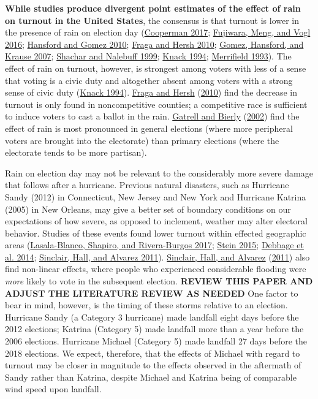 \documentclass[
  12pt,
]{article}
\begin{document}
\textbf{While studies produce divergent point estimates of the effect of rain on turnout in the United States}, the consensus is that turnout is lower in the presence of rain on election day (\protect\hyperlink{ref-Cooperman2017}{Cooperman 2017}; \protect\hyperlink{ref-Fujiwara2016}{Fujiwara, Meng, and Vogl 2016}; \protect\hyperlink{ref-Hansford2010}{Hansford and Gomez 2010}; \protect\hyperlink{ref-Fraga2010}{Fraga and Hersh 2010}; \protect\hyperlink{ref-Gomez2007}{Gomez, Hansford, and Krause 2007}; \protect\hyperlink{ref-Shachar1999}{Shachar and Nalebuff 1999}; \protect\hyperlink{ref-Knack1994}{Knack 1994}; \protect\hyperlink{ref-Merrifield1993}{Merrifield 1993}). The effect of rain on turnout, however, is strongest among voters with less of a sense that voting is a civic duty and altogether absent among voters with a strong sense of civic duty (\protect\hyperlink{ref-Knack1994}{Knack 1994}). \protect\hyperlink{ref-Fraga2010}{Fraga and Hersh} (\protect\hyperlink{ref-Fraga2010}{2010}) find the decrease in turnout is only found in noncompetitive counties; a competitive race is sufficient to induce voters to cast a ballot in the rain. \protect\hyperlink{ref-Gatrell2002}{Gatrell and Bierly} (\protect\hyperlink{ref-Gatrell2002}{2002}) find the effect of rain is most pronounced in general elections (where more peripheral voters are brought into the electorate) than primary elections (where the electorate tends to be more partisan).

Rain on election day may not be relevant to the considerably more severe damage that follows after a hurricane. Previous natural disasters, such as Hurricane Sandy (2012) in Connecticut, New Jersey and New York and Hurricane Katrina (2005) in New Orleans, may give a better set of boundary conditions on our expectations of how severe, as opposed to inclement, weather may alter electoral behavior. Studies of these events found lower turnout within effected geographic areas (\protect\hyperlink{ref-Lasala-Blanco2017}{Lasala-Blanco, Shapiro, and Rivera-Burgos 2017}; \protect\hyperlink{ref-Stein2015}{Stein 2015}; \protect\hyperlink{ref-Debbage2014}{Debbage et al. 2014}; \protect\hyperlink{ref-Sinclair2011}{Sinclair, Hall, and Alvarez 2011}). \protect\hyperlink{ref-Sinclair2011}{Sinclair, Hall, and Alvarez} (\protect\hyperlink{ref-Sinclair2011}{2011}) also find non-linear effects, where people who experienced considerable flooding were \emph{more} likely to vote in the subsequent election. \textbf{REVIEW THIS PAPER AND ADJUST THE LITERATURE REVIEW AS NEEDED} One factor to bear in mind, however, is the timing of these storms relative to an election. Hurricane Sandy (a Category 3 hurricane) made landfall eight days before the 2012 elections; Katrina (Category 5) made landfall more than a year before the 2006 elections. Hurricane Michael (Category 5) made landfall 27 days before the 2018 elections. We expect, therefore, that the effects of Michael with regard to turnout may be closer in magnitude to the effects observed in the aftermath of Sandy rather than Katrina, despite Michael and Katrina being of comparable wind speed upon landfall.
\end{document}
